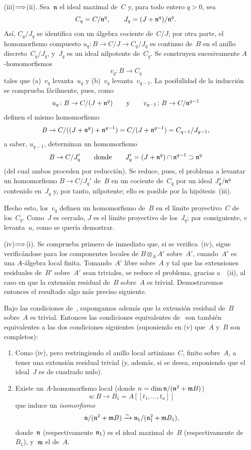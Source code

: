 
(iii)$\Longrightarrow$(ii).
Sea~$\mathfrak{n}$ el ideal maximal de~$C$ y, para todo entero $q>0$, sea
$$
C_q=C/\mathfrak{n}^q,\qquad J_q=(J+\mathfrak{n}^q)/\mathfrak{n}^q.
$$
Así, $C_q/J_q$ se identifica con un álgebra cociente de~$C/J$; por otra parte, el homomorfismo compuesto $u_q\colon B\to C/J\to C_q/J_q$ es continuo de~$B$ en el anillo discreto~$C_q/J_q$, y~$J_q$ es un ideal nilpotente de~$C_q$. Se construyen sucesivamente $A$-homomorfismos
$$
v_q\colon B\to C_q
$$
tales que (a)~$v_q$ levanta~$u_q$ y (b)~$v_q$ levanta~$v_{q-1}$. La posibilidad de la inducción se comprueba fácilmente, pues, como
$$
u_q\colon B\to C/(J+\mathfrak{n}^q)\qquad\text{y}\qquad
v_{q-1}\colon B\to C/\mathfrak{n}^{q-1}
$$
definen el mismo homomorfismo
$$
B\to C/((J+\mathfrak{n}^q)+\mathfrak{n}^{q-1})
=C/(J+\mathfrak{n}^{q-1})=C_{q-1}/J_{q-1},
$$
a saber, $u_{q-1}$, determinan un homomorfismo
$$
B\to C/J_q'\qquad\text{donde}\qquad
J_q'=(J+\mathfrak{n}^q)\cap\mathfrak{n}^{q-1}\supset\mathfrak{n}^q
$$
(del cual ambos proceden por reducción). Se reduce, pues, el problema a levantar un homomorfismo $B\to C/J_q'$ de~$B$ en un cociente de~$C_q$ por un ideal $J_q'/\mathfrak{n}^q$ contenido en~$J_q$ y, por tanto, nilpotente; ello es posible por la hipótesis~(iii).

Hecho esto, los~$v_q$ definen un homomorfismo de~$B$ en el límite proyectivo~$C$ de los~$C_q$. Como~$J$ es cerrado, $J$ es el límite proyectivo de los~$J_q$; por consiguiente, $v$ levanta~$u$, como se quería demostrar.

(iv)$\Longrightarrow$(i). Se comprueba primero de inmediato que, si se verifica~(iv), sigue verificándose para los componentes locales de $B\otimes_A A'$ sobre~$A'$, cuando~$A'$ es una $A$-álgebra local finita. Tomando~$A'$ libre sobre~$A$ y tal que las extensiones residuales de~$B'$ sobre~$A'$ sean triviales, se reduce el problema, gracias a~~(ii), al caso en que la extensión residual de~$B$ sobre~$A$ es trivial. Demostraremos entonces el resultado algo más preciso siguiente.

\begin{corollaire}
\label{III.2.2}
Bajo las condiciones de~, supongamos además que la extensión residual de~$B$ sobre~$A$ es trivial. Entonces las condiciones equivalentes
de~ son también equivalentes a las dos condiciones siguientes (suponiendo en \textup{(v)} que~$A$ y~$B$ son completos):
\begin{enumerate}
\item[(iv~ter)] Como \textup{(iv)}, pero restringiendo el anillo local artiniano~$C$, finito sobre~$A$, a tener una extensión residual trivial (y, además, si se desea, suponiendo que el ideal~$J$ es de cuadrado nulo).
\item[(v)] Existe un $A$-homomorfismo local (donde $n=\dim \mathfrak{n}/(\mathfrak{n}^2+\mathfrak{m}B)$)
$$
u\colon B\to B_1=A[[t_1,\dots,t_n]]
$$
que induce un \emph{isomorfismo}
$$
\mathfrak{n}/(\mathfrak{n}^2+\mathfrak{m}B)\xrightarrow{\sim}
\mathfrak{n}_1/(\mathfrak{n}_1^2+\mathfrak{m}B_1),
$$
donde~$\mathfrak{n}$ (respectivamente $\mathfrak{n}_1$) es el ideal maximal de~$B$ (respectivamente de~$B_1$), y~$\mathfrak{m}$ el de~$A$.
\end{enumerate}
\end{corollaire}

